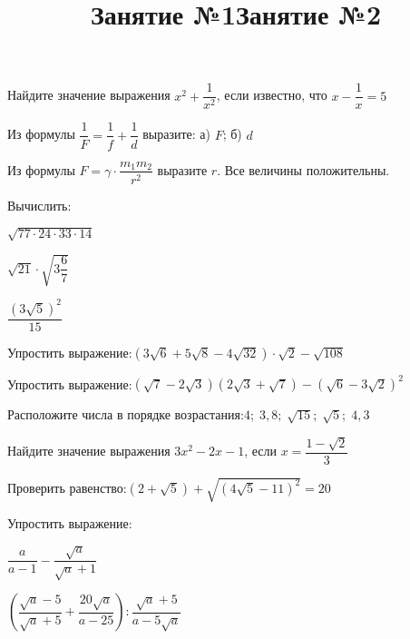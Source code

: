 \title{Занятие №1}
\begin{listofex}
	\item {}
	\item {}
	\item Найдите значение выражения \( x^2+\dfrac{1}{x^2} \), если известно, что \( x-\dfrac{1}{x}=5 \)
	\item Из формулы \( \dfrac{1}{F}=\dfrac{1}{f}+\dfrac{1}{d} \) выразите: а) \( F \); б) \( d \)
	\item Из формулы \( F=\gamma\cdot\dfrac{m_1m_2}{r^2} \) выразите \( r \). Все величины положительны.
	\item Вычислить:
	\begin{enumcols}[itemcolumns=3]
		\item \( \sqrt{77\cdot24\cdot33\cdot14} \)
		\item \( \sqrt{21}\cdot\sqrt{3\dfrac{6}{7}} \)
		\item \( \dfrac{(3\sqrt{5})^2}{15} \)
	\end{enumcols}
	
	\item Упростить выражение:\quad\( (3\sqrt{6}+5\sqrt{8}-4\sqrt{32})\cdot\sqrt{2}-\sqrt{108} \)
	\item Упростить выражение:\quad\( (\sqrt{7}-2\sqrt{3})(2\sqrt{3}+\sqrt{7})-(\sqrt{6}-3\sqrt{2})^2 \)
	\item Расположите числа в порядке возрастания:\quad\( 4;\;3,8;\;\sqrt{15};\;\sqrt{5};\;4,3 \)
	\item Найдите значение выражения \( 3x^2-2x-1 \), если \( x=\dfrac{1-\sqrt{2}}{3} \)
	\item Проверить равенство:\quad\( (2+\sqrt{5})+\sqrt{(4\sqrt{5}-11)^2}=20 \)
	\item Упростить выражение:
	\begin{enumcols}[itemcolumns=2]
		\item \( \dfrac{a}{a-1}-\dfrac{\sqrt{a}}{\sqrt{a}+1} \)
		\item \( \left( \dfrac{\sqrt{a}-5}{\sqrt{a}+5}+\dfrac{20\sqrt{a}}{a-25} \right):\dfrac{\sqrt{a}+5}{a-5\sqrt{a}} \)
	\end{enumcols}
\end{listofex}
\newpage
\title{Занятие №2}

